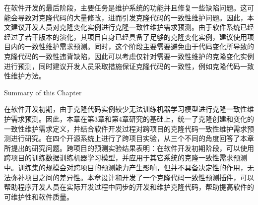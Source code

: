 在软件开发的最后阶段，主要任务是维护系统的功能并且修复一些缺陷问题。这可能会导致对克隆代码的大量修改，进而引发克隆代码的一致性维护问题。因此，本文建议开发人员对克隆变化实例进行克隆一致性维护需求预测。由于软件系统已经经过了若干版本的演化，其项目自身已经具备了足够的克隆变化实例，建议使用项目内的一致性维护需求预测。同时，这个阶段主要需要避免由于代码变化所导致的克隆代码的一致性违背缺陷，因此可以考虑仅针对需要一致性维护的克隆变化实例进行预测，同时建议开发人员采取措施保证克隆代码的一致性，例如克隆代码一致性维护方法\cite{cheng2016rule,nguyen2012clone}。


{Summary of this Chapter}

在软件开发初期，由于克隆代码实例较少无法训练机器学习模型进行克隆一致性维护需求预测。因此，本章在第3章和第4章研究的基础上，统一了克隆创建和变化的一致性维护需求定义，并结合软件开发过程对跨项目的克隆代码一致性维护需求预测进行研究。在四个开源系统上进行了跨项目实验，从三个不同的角度回答了本章所提出的研究问题。跨项目的预测实验结果表明：在软件开发初期阶段，可以使用跨项目的训练数据训练机器学习模型，并应用于其它系统的克隆一致性需求预测中。训练集的规模会对跨项目的预测能力产生影响，但并不具备决定性的作用，无法弥补项目之间的差异性。本章设计和开发了一个克隆代码一致性预测插件，可以帮助程序开发人员在实际开发过程中同步的开发和维护克隆代码，帮助提高软件的可维护性和软件质量。